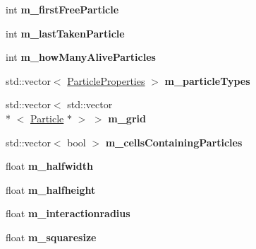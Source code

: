 \begin{DoxyCompactItemize}
\item 
\hypertarget{classWorld_a8aa72ceb0053b37ebf3bfc9dfa3f7d67}{int {\bfseries m\-\_\-first\-Free\-Particle}}\label{classWorld_a8aa72ceb0053b37ebf3bfc9dfa3f7d67}

\item 
\hypertarget{classWorld_ac3a684ea22c602344a61fc3ff7c8f444}{int {\bfseries m\-\_\-last\-Taken\-Particle}}\label{classWorld_ac3a684ea22c602344a61fc3ff7c8f444}

\item 
\hypertarget{classWorld_a0e8bf89890e6e1874e53ed8db76e885c}{int {\bfseries m\-\_\-how\-Many\-Alive\-Particles}}\label{classWorld_a0e8bf89890e6e1874e53ed8db76e885c}

\item 
\hypertarget{classWorld_af3a83d8820ece274292746482991d9a0}{std\-::vector$<$ \hyperlink{classParticleProperties}{Particle\-Properties} $>$ {\bfseries m\-\_\-particle\-Types}}\label{classWorld_af3a83d8820ece274292746482991d9a0}

\item 
\hypertarget{classWorld_a4f43c7ae20726ca36a2438fc05dba9e6}{std\-::vector$<$ std\-::vector\\*
$<$ \hyperlink{classParticle}{Particle} $\ast$ $>$ $>$ {\bfseries m\-\_\-grid}}\label{classWorld_a4f43c7ae20726ca36a2438fc05dba9e6}

\item 
\hypertarget{classWorld_aa57d6923952272b039a5c21a3e6825aa}{std\-::vector$<$ bool $>$ {\bfseries m\-\_\-cells\-Containing\-Particles}}\label{classWorld_aa57d6923952272b039a5c21a3e6825aa}

\item 
\hypertarget{classWorld_a666e2c46e2cf9783797590fd75cafcc9}{float {\bfseries m\-\_\-halfwidth}}\label{classWorld_a666e2c46e2cf9783797590fd75cafcc9}

\item 
\hypertarget{classWorld_a0aa12b651999b6f3a2750d97f78387e8}{float {\bfseries m\-\_\-halfheight}}\label{classWorld_a0aa12b651999b6f3a2750d97f78387e8}

\item 
\hypertarget{classWorld_addb51e059703e6f0955645740acef336}{float {\bfseries m\-\_\-interactionradius}}\label{classWorld_addb51e059703e6f0955645740acef336}

\item 
\hypertarget{classWorld_aff556d4e76e843b54c25fbeece28fee7}{float {\bfseries m\-\_\-squaresize}}\label{classWorld_aff556d4e76e843b54c25fbeece28fee7}


\end{DoxyCompactItemize}
